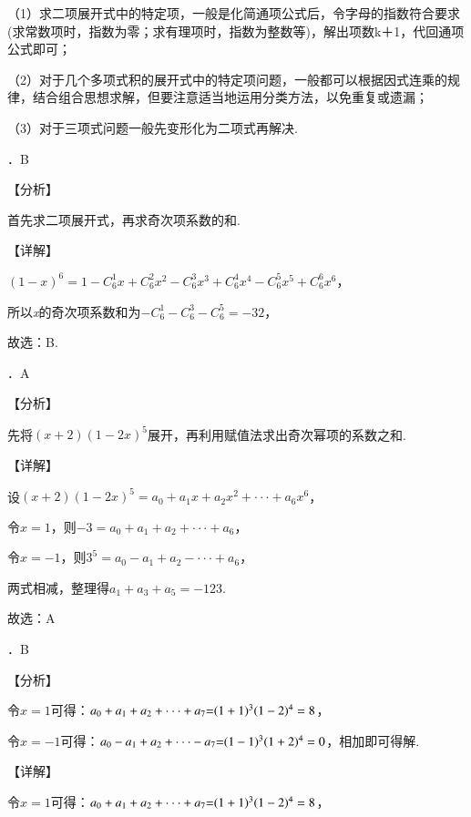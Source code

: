 \documentclass[a4paper,11pt,UTF8,twoside]{ctexart} %
\begin{document}
\noindent （1）求二项展开式中的特定项，一般是化简通项公式后，令字母的指数符合要求(求常数项时，指数为零；求有理项时，指数为整数等)，解出项数k＋1，代回通项公式即可；

\noindent （2）对于几个多项式积的展开式中的特定项问题，一般都可以根据因式连乘的规律，结合组合思想求解，但要注意适当地运用分类方法，以免重复或遗漏；

\noindent （3）对于三项式问题一般先变形化为二项式再解决.

．B

\noindent 【分析】

\noindent 首先求二项展开式，再求奇次项系数的和.

\noindent 【详解】

\noindent $\left(1-x\right)^{6} =1-C_{6}^{1} x+C_{6}^{2} x^{2} -C_{6}^{3} x^{3} +C_{6}^{4} x^{4} -C_{6}^{5} x^{5} +C_{6}^{6} x^{6} $，

\noindent 所以\textit{x}的奇次项系数和为$-C_{6}^{1} -C_{6}^{3} -C_{6}^{5} =-32$，

\noindent 故选：B.

．A

\noindent 【分析】

\noindent 先将$\left(x+2\right)\left(1-2x\right)^{5} $展开，再利用赋值法求出奇次幂项的系数之和.

\noindent 【详解】

\noindent 设$\left(x+2\right)\left(1-2x\right)^{5} =a_{0} +a_{1} x+a_{2} x^{2} +\cdot \cdot \cdot +a_{6} x^{6} $，

\noindent 令$x=1$，则$-3=a_{0} +a_{1} +a_{2} +\cdot \cdot \cdot +a_{6} $，

\noindent 令$x=-1$，则$3^{5} =a_{0} -a_{1} +a_{2} -\cdot \cdot \cdot +a_{6} $，

\noindent 两式相减，整理得$a_{1} +a_{3} +a_{5} =-123$.

\noindent 故选：A

．B

\noindent 【分析】

\noindent 令$x=1$可得：$a_{0} +a_{1} +a_{2} +\cdot \cdot \cdot +a_{7} {\rm =}(1+1)^{3} (1-2)^{4} =8$，

\noindent 令$x=-1$可得：$a_{0} -a_{1} +a_{2} +\cdot \cdot \cdot -a_{7} {\rm =}(1-1)^{3} (1+2)^{4} =0$，相加即可得解.

\noindent 【详解】

\noindent 令$x=1$可得：$a_{0} +a_{1} +a_{2} +\cdot \cdot \cdot +a_{7} {\rm =}(1+1)^{3} (1-2)^{4} =8$，
\end{document}

